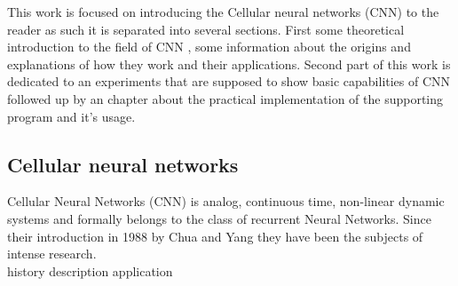 This work is focused on introducing the Cellular neural networks (CNN) to the reader as such it is separated into several sections. First some theoretical introduction to the field of CNN , some information about the origins and explanations of how they work and their applications. Second part of this work is dedicated to an experiments that are supposed to show basic capabilities of CNN followed up by an chapter about the practical implementation of the supporting program and it's usage. 


\subsection{Cellular neural networks}
Cellular Neural Networks (CNN) is analog, continuous time, non-linear dynamic
systems and formally belongs to the class of recurrent Neural Networks. Since
their introduction in 1988 by Chua and Yang \cite{Chua-Yang} they have been the subjects of
intense research. \\
history
description
application